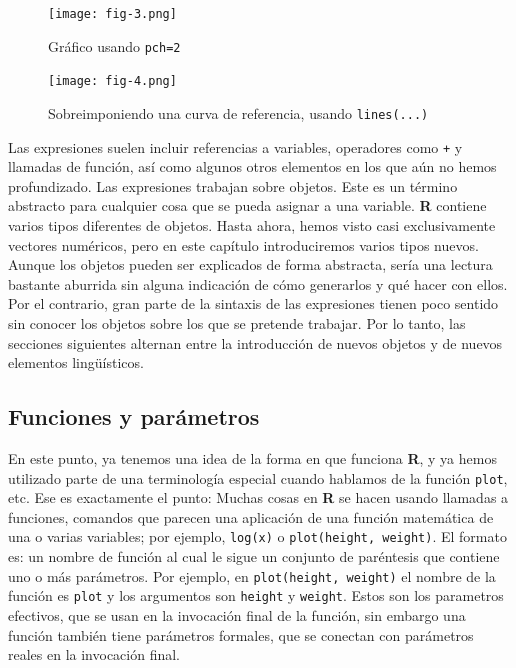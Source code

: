\begin{figure}[H]
    \texttt{[image: fig-3.png]}
    \caption{Gráfico usando \texttt{pch=2}}
    \label{fig-3}
 \end{figure}

 \begin{figure}[H]
    \texttt{[image: fig-4.png]}
	\caption{Sobreimponiendo una curva de referencia, usando \texttt{lines(...)}}
    \label{fig-4}
 \end{figure}


Las expresiones suelen incluir referencias a variables, operadores como
\texttt{+} y llamadas de función, así como algunos otros elementos en los que
aún no hemos profundizado.  Las expresiones trabajan sobre objetos. Este es un
término abstracto para cualquier cosa que se pueda asignar a una variable.
\textbf{R} contiene varios tipos diferentes de objetos. Hasta ahora, hemos
visto casi exclusivamente vectores numéricos, pero en este capítulo
introduciremos varios tipos nuevos.  Aunque los objetos pueden ser explicados
de forma abstracta, sería una lectura bastante aburrida sin alguna indicación
de cómo generarlos y qué hacer con ellos. Por el contrario, gran parte de la
sintaxis de las expresiones tienen poco sentido sin conocer los objetos sobre
los que se pretende trabajar. Por lo tanto, las secciones siguientes alternan
entre la introducción de nuevos objetos y de nuevos elementos lingüísticos.

\subsection{Funciones y parámetros}

En este punto, ya tenemos una idea de la forma en que funciona \textbf{R}, y ya
hemos utilizado parte de una terminología especial cuando hablamos de la
función \texttt{plot}, etc. Ese es exactamente el punto: Muchas cosas en
\textbf{R} se hacen usando llamadas a funciones, comandos que parecen una
aplicación de una función matemática de una o varias variables; por ejemplo,
\texttt{log(x)} o \texttt{plot(height, weight)}. El formato es: un nombre de
función al cual le sigue un conjunto de paréntesis que contiene uno o más
parámetros. Por ejemplo, en \texttt{plot(height, weight)} el nombre de la
función es \texttt{plot} y los argumentos son \texttt{height} y
\texttt{weight}.  Estos son los parametros efectivos, que se usan en la
invocación final de la función, sin embargo una función también tiene
parámetros formales, que se conectan con parámetros reales en la invocación
final.

